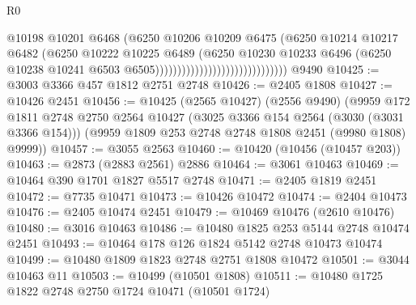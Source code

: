 \begin{lexlean}{R0}
\begin{coremodule}
                                                      @10198
                                                      @10201
                                                      @6468
                                                      (@6250
                                                        @10206
                                                        @10209
                                                        @6475
                                                        (@6250
                                                          @10214
                                                          @10217
                                                          @6482
                                                          (@6250
                                                            @10222
                                                            @10225
                                                            @6489
                                                            (@6250
                                                              @10230
                                                              @10233
                                                              @6496
                                                              (@6250
                                                                @10238
                                                                @10241
                                                                @6503
                                                                @6505))))))))))))))))))))))))))))))
    @9490
@10425 := @3003 @3366 @457 @1812 @2751 @2748
@10426 := @2405 @1808
@10427 := @10426 @2451
@10456 := @10425
    (@2565 @10427)
    (@2556 @9490)
    (@9959
      @172
      @1811
      @2748
      @2750
      @2564
      @10427
      (@3025 @3366 @154 @2564 (@3030 (@3031 @3366 @154)))
      (@9959 @1809 @253 @2748 @2748 @1808 @2451 (@9980 @1808) @9999))
@10457 := @3055 @2563
@10460 := @10420 (@10456 (@10457 @203))
@10463 := @2873 (@2883 @2561) @2886
@10464 := @3061 @10463
@10469 := @10464 @390 @1701 @1827 @5517 @2748
@10471 := @2405 @1819 @2451
@10472 := @7735 @10471
@10473 := @10426 @10472
@10474 := @2404 @10473
@10476 := @2405 @10474 @2451
@10479 := @10469 @10476 (@2610 @10476)
@10480 := @3016 @10463
@10486 := @10480 @1825 @253 @5144 @2748 @10474 @2451
@10493 := @10464 @178 @126 @1824 @5142 @2748 @10473 @10474
@10499 := @10480 @1809 @1823 @2748 @2751 @1808 @10472
@10501 := @3044 @10463 @11
@10503 := @10499 (@10501 @1808)
@10511 := @10480 @1725 @1822 @2748 @2750 @1724 @10471 (@10501 @1724)

\end{coremodule}
\end{lexlean}
